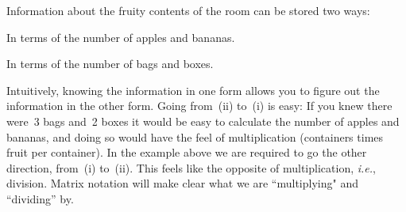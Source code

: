 %
\noindent
Information about the fruity contents of the room can be stored two ways: 
\begin{enumext}[label=\roman*,wrap-label=(#1)]
\item In terms of the number of apples and bananas. 
\item In terms of the number of bags and boxes. 
\end{enumext}
Intuitively, knowing the information in one form allows you to figure out the information in the other form. 
Going from~(ii) to~(i) is easy: 
If you knew there were~3 bags and~2 boxes it would be easy to calculate the number of apples and bananas, and doing so would have the feel of multiplication (containers times fruit per container). 
In the example above we are required to go the other direction, from~(i) to~(ii). This  feels like the opposite of multiplication, {\itshape i.e.}, division. Matrix notation will 
make clear what we are ``multiplying" and ``dividing'' by. 

